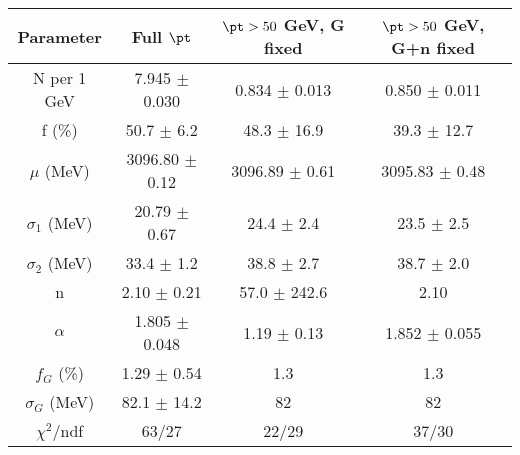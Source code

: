 \begin{tabular}{c||c|c|c}
Parameter & Full $\pt$ & $\pt>50$ GeV, G fixed & $\pt>50$ GeV, G+n fixed \\
\hline
N per 1 GeV & 7.945 $\pm$ 0.030 & 0.834 $\pm$ 0.013 & 0.850 $\pm$ 0.011\\
f (\%) & 50.7 $\pm$ 6.2 & 48.3 $\pm$ 16.9 & 39.3 $\pm$ 12.7\\
$\mu$ (MeV) & 3096.80 $\pm$ 0.12 & 3096.89 $\pm$ 0.61 & 3095.83 $\pm$ 0.48\\
$\sigma_1$ (MeV) & 20.79 $\pm$ 0.67 & 24.4 $\pm$ 2.4 & 23.5 $\pm$ 2.5\\
$\sigma_2$ (MeV) & 33.4 $\pm$ 1.2 & 38.8 $\pm$ 2.7 & 38.7 $\pm$ 2.0\\
n & 2.10 $\pm$ 0.21 & 57.0 $\pm$ 242.6 & 2.10\\
$\alpha$ & 1.805 $\pm$ 0.048 & 1.19 $\pm$ 0.13 & 1.852 $\pm$ 0.055\\
$f_G$ (\%) & 1.29 $\pm$ 0.54 & 1.3 & 1.3\\
$\sigma_G$ (MeV) & 82.1 $\pm$ 14.2 & 82 & 82\\
\hline
$\chi^2$/ndf & 63/27 & 22/29 & 37/30\\
\end{tabular}
